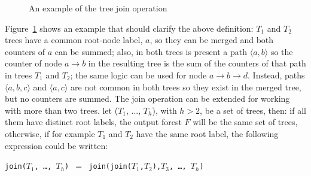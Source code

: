 \documentclass[a4paper,10pt]{report}
\begin{document}
\begin{figure}[h]

\begin{center}
\end{center}

\caption{An example of the tree join operation}
\label{join1}
\end{figure}

Figure~\ref{join1} shows an example that should clarify the above definition:
$T_1$ and $T_2$ trees have a common root-node label, $a$, so they can be merged and 
both counters of $a$ can be summed; also, in both trees is present a path $\langle a,b\rangle$ so the counter of node $a\rightarrow b$ in the resulting tree 
is the sum of the counters of that path in trees $T_1$ and $T_2$; 
the same logic can be used for node $a\rightarrow b\rightarrow d$. 
Instead, paths $\langle a, b, c\rangle$ and $\langle a, c\rangle$ are not common 
in both trees so they exist in the merged tree, but no counters are summed.
The join operation can be extended for working with more than two trees.
let ($T_1$, ..., $T_h$), with $h > 2$, be a set of trees, then:
if all them have distinct root labels, the output forest $F$ will be the same
set of trees, otherwise, if for example $T_1$ and $T_2$ have the same root label,
the following expression could be written:
\begin{center}
\texttt{join($T_1$, \dots, $T_h$) $=$ join(join($T_1$,$T_2$),$T_3$, \ldots, $T_h$)}
\end{center}
\end{document}
